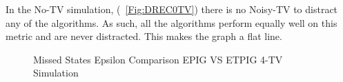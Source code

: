 \documentclass[12pt]{thesis}
\begin{document}
In the No-TV simulation, (\figurename~\ref{Fig:DREC0TV}) there is no Noisy-TV to distract any of the algorithms. As such, all the algorithms perform equally well on this metric and are never distracted. This makes the graph a flat line.
\begin{figure}
	\begin{center}
		\hfill
			
		\hfill
	\end{center}
	\caption{Missed States Epsilon Comparison EPIG VS ETPIG 4-TV Simulation}
	\label{Fig:EMEC4TV}
\end{figure}
\end{document}
